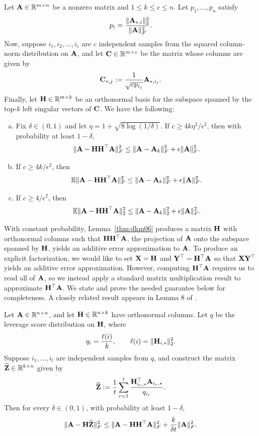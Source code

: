 \begin{lemma}
\label{thm:dkm06}
    Let $\mathbf{A}\in\mathbb{R}^{m\times n}$ be a nonzero matrix and $1\leq k\leq c\leq n$. Let $p_1, \ldots, p_n$ satisfy
    \[p_i = \frac{\|\mathbf{A}_{*, i}\|^2_2}{\|\mathbf{A}\|^2_F}.\]
    Now, suppose $i_1, i_2, \ldots, i_c$ are $c$ independent samples from the squared column-norm distribution on $\mathbf{A}$, and let $\mathbf{C}\in\mathbb{R}^{m\times c}$ be the matrix whose columns are given by
    \[\mathbf{C}_{*, j} := \frac{1}{\sqrt{cp_{i_j}}}\mathbf{A}_{*, i_j}.\]
    Finally, let $\mathbf{H}\in\mathbb{R}^{m\times k}$ be an orthonormal basis for the subspace spanned by the top-$k$ left singular vectors of $\mathbf{C}$. We have the following:
    \begin{enumerate}[(a)]
        \item Fix $\delta\in(0,1)$ and let $\eta=1+\sqrt{8\log(1/\delta)}$. If $c\geq 4k\eta^2/\epsilon^2$, then with probability at least $1-\delta$,
    \[\|\mathbf{A} - \mathbf{H}\mathbf{H}^\top\mathbf{A}\|^2_F\leq \|\mathbf{A} - \mathbf{A}_k\|^2_F + \epsilon \|\mathbf{A}\|^2_F.\]
        \item If $c\geq 4k/\epsilon^2$, then 
        \[\mathbb{E}\|\mathbf{A} - \mathbf{H}\mathbf{H}^\top\mathbf{A}\|^2_F\leq \|\mathbf{A} - \mathbf{A}_k\|^2_F + \epsilon \|\mathbf{A}\|^2_F.\]
        \item If $c\geq 4/\epsilon^2$, then
        \[\mathbb{E}\|\mathbf{A} - \mathbf{H}\mathbf{H}^\top\mathbf{A}\|^2_2\leq \|\mathbf{A} - \mathbf{A}_k\|^2_2 + \epsilon \|\mathbf{A}\|^2_F.\]
    \end{enumerate}
\end{lemma}

With constant probability, Lemma~\ref{thm:dkm06} produces a matrix $\mathbf{H}$ with orthonormal columns such that $\mathbf{H}\mathbf{H}^\top\mathbf{A}$, the projection of $\mathbf{A}$ onto the subspace spanned by $\mathbf{H}$, yields an additive error approximation to $\mathbf{A}$. To produce an explicit factorization, we would like to set $\mathbf{X} = \mathbf{H}$ and $\mathbf{Y}^\top = \mathbf{H}^\top \mathbf{A}$ so that $\mathbf{X}\mathbf{Y}^\top$ yields an additive error approximation. However, computing $\mathbf{H}^\top\mathbf{A}$ requires us to read all of $\mathbf{A}$, so we instead apply a standard matrix multiplication result to approximate $\mathbf{H}^\top \mathbf{A}$. We state and prove the needed guarantee below for completeness. A closely related result appears in Lemma 8 of \cite{drineas_fast_2006}.

\begin{lemma}
\label{lem:probabilistic-right-factor}
Let \(\mathbf{A}\in\mathbb{R}^{n\times n}\), and let
\(\mathbf{H}\in\mathbb{R}^{n\times k}\) have orthonormal columns. Let $q$ be the leverage score distribution on $\mathbf{H}$, where
\[
    q_i = \frac{\ell(i)}{k},\qquad \ell(i) = \|\mathbf{H}_{i,*}\|^2_2.
\]
Suppose \(i_1,\ldots, i_t\) are independent samples from \(q\), and construct the matrix $\widehat{\mathbf{Z}}\in\mathbb{R}^{k\times n}$ given by
\[
    \widehat{\mathbf{Z}}
    :=
    \frac{1}{t}\sum_{r=1}^t
    \frac{\mathbf{H}_{i_r,*}^{\top}\mathbf{A}_{i_r,*}}{q_{i_r}}
    .
\]
Then for every \(\delta\in(0,1)\), with probability at least \(1-\delta\),
\[
    \|\mathbf{A}-\mathbf{H}\widehat{\mathbf{Z}}\|_F^2
    \leq
    \|\mathbf{A}-\mathbf{H}\mathbf{H}^\top\mathbf{A}\|_F^2
    +
    \frac{k}{\delta t}\|\mathbf{A}\|_F^2.
\]
\end{lemma}

